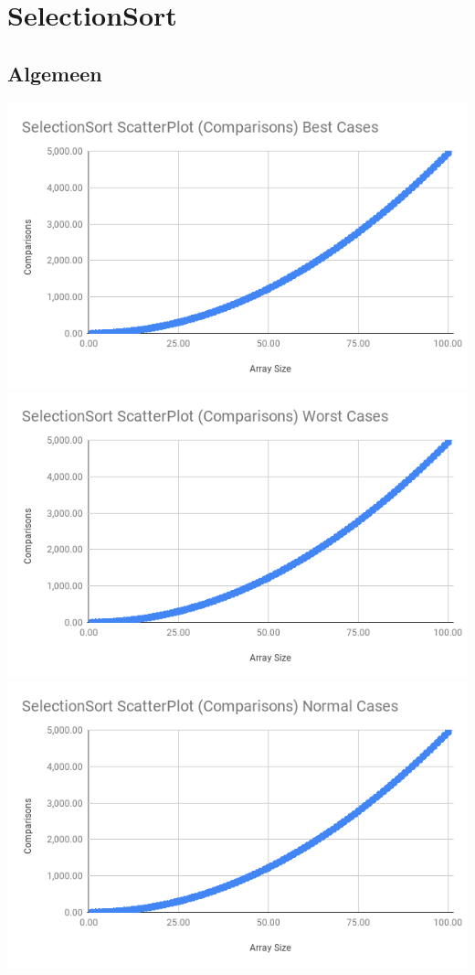 \section{SelectionSort}

\subsection{Algemeen}

\includegraphics[scale=0.3]{sections/media/SS_C_BC}
\includegraphics[scale=0.3]{sections/media/SS_C_WC}
\includegraphics[scale=0.6]{sections/media/SS_C_NC}

